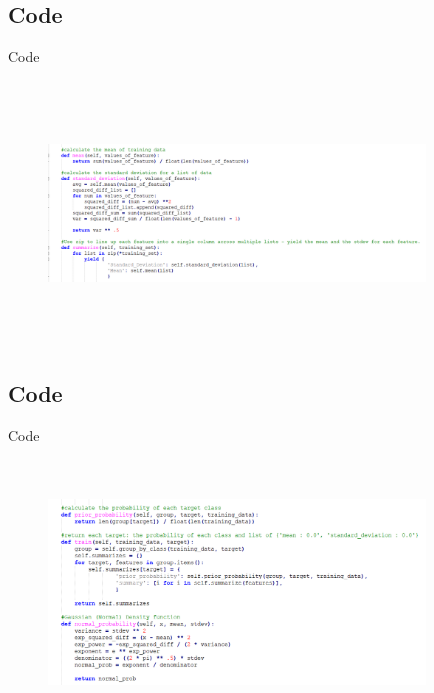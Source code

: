 \documentclass{beamer}
\begin{document}
\subsection{Code}
    \begin{frame}{Code}
        \begin{center}
            \begin{figure}
                \begin{center}
                    \includegraphics[width = 10cm, height = 7cm]{Theme/images/gaussian2.PNG}
                \end{center}
            \end{figure}
        \end{center}
    \end{frame}

\subsection{Code}
    \begin{frame}{Code}
        \begin{center}
            \begin{figure}
                \begin{center}
                    \includegraphics[width = 10cm, height = 7cm]{Theme/images/gaussian3.PNG}
                \end{center}
            \end{figure}
        \end{center}
    \end{frame}
\end{document}
